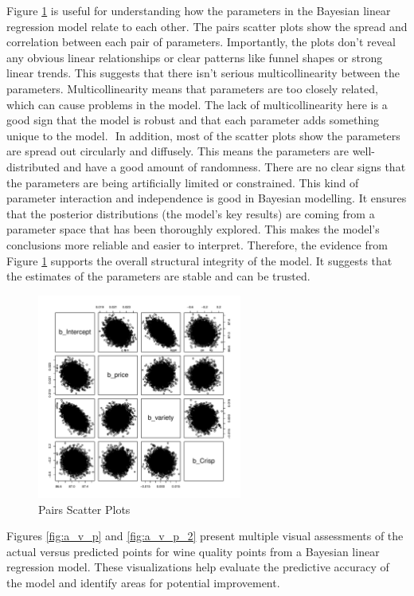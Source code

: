 \documentclass{article}
\begin{document}
Figure \ref{fig:Pairs_Scatter_Plots} is useful for understanding how the parameters in the Bayesian linear regression model relate to each other. ⁤⁤The pairs scatter plots show the spread and correlation between each pair of parameters. ⁤⁤Importantly, the plots don't reveal any obvious linear relationships or clear patterns like funnel shapes or strong linear trends. This suggests that there isn't serious multicollinearity between the parameters. ⁤⁤Multicollinearity means that parameters are too closely related, which can cause problems in the model. The lack of multicollinearity here is a good sign that the model is robust and that each parameter adds something unique to the model. ⁤
⁤In addition, most of the scatter plots show the parameters are spread out circularly and diffusely. This means the parameters are well-distributed and have a good amount of randomness. There are no clear signs that the parameters are being artificially limited or constrained. ⁤⁤This kind of parameter interaction and independence is good in Bayesian modelling. It ensures that the posterior distributions (the model's key results) are coming from a parameter space that has been thoroughly explored. This makes the model's conclusions more reliable and easier to interpret. ⁤⁤Therefore, the evidence from Figure \ref{fig:Pairs_Scatter_Plots} supports the overall structural integrity of the model. It suggests that the estimates of the parameters are stable and can be trusted. ⁤

\begin{figure}[htbp]
	\centering
	\includegraphics[width=0.6\textwidth]{imgs/Pairs_Scatter_Plots.pdf}
	\caption{Pairs Scatter Plots}
	\label{fig:Pairs_Scatter_Plots}
\end{figure}

Figures \ref{fig:a_v_p} and \ref{fig:a_v_p_2} present multiple visual assessments of the actual versus predicted points for wine quality points from a Bayesian linear regression model. These visualizations help evaluate the predictive accuracy of the model and identify areas for potential improvement.
\end{document}
